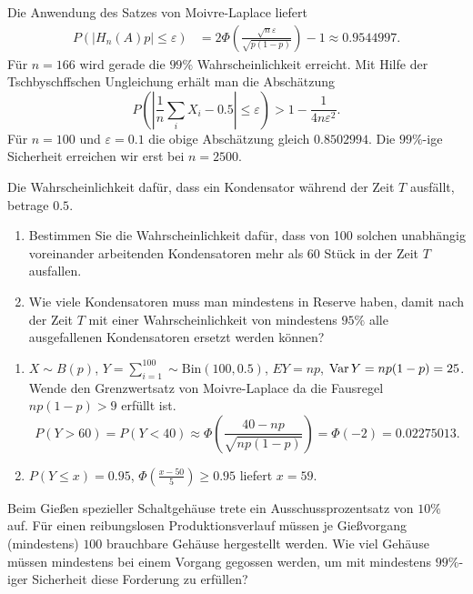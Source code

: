 \solution Die Anwendung des Satzes von Moivre-Laplace liefert
\begin{align*}
    P\left( | H_n(A) p | \leq \varepsilon \right) &= 
    2 \Phi\left ( \frac{\sqrt{n} \varepsilon}{ \sqrt{ p(1-p) }  } \right) -1 \approx 0.9544997.
\end{align*}
Für $n=166$ wird gerade die $99\%$ Wahrscheinlichkeit erreicht. Mit Hilfe der Tschbyschffschen
Ungleichung erhält man die Abschätzung
\begin{equation}
    P \left( | \frac{1}{n} \sum_{i}^{} X_i - 0.5 | \leq \varepsilon \right) > 1 - \frac{1}{4 n \varepsilon^2}.
\end{equation}
Für $n=100$ und $\varepsilon=0.1$ die obige Abschätzung gleich $0.8502994$. Die $99\%$-ige
Sicherheit erreichen wir erst bei $n=2500$. 

 Die Wahrscheinlichkeit dafür,
dass ein Kondensator während der Zeit $T$ ausfällt, betrage $0.5$. 
\begin{enumerate}
    \item Bestimmen Sie die Wahrscheinlichkeit dafür, dass von 100 solchen
        unabhängig voreinander arbeitenden Kondensatoren mehr als $60$ Stück in
        der Zeit $T$ ausfallen. 
    \item Wie viele Kondensatoren muss man mindestens in Reserve haben, damit
        nach der Zeit $T$ mit einer Wahrscheinlichkeit von mindestens $95\%$
        alle ausgefallenen Kondensatoren ersetzt werden können?
\end{enumerate}

\solution 
\begin{enumerate}
    \item $X\sim B(p)$, $Y=\sum_{i=1}^{100} \sim \text{Bin}(100,0.5)$, $E Y =
        np$, $\operatorname{Var} Y = np(1-p)= 25$. Wende den Grenzwertsatz von Moivre-Laplace
        da die Fausregel $np(1-p)>9$ erfüllt ist.
        \begin{equation*}
            P(Y>60) = P(Y < 40) \approx 
            \Phi\left( \frac{40 - np}{ \sqrt{np(1-p)}} \right) =
            \Phi(-2) = 0.02275013.
        \end{equation*}

    \item $P(Y \leq x) = 0.95$, $\Phi\left( \frac{x-50}{5} \right) \geq 0.95$
        liefert $x=59$. 
\end{enumerate}

 Beim Gießen spezieller
Schaltgehäuse trete ein Ausschussprozentsatz von $10\%$ auf. Für einen
reibungslosen Produktionsverlauf müssen je Gießvorgang (mindestens) $100$
brauchbare Gehäuse hergestellt werden.  Wie viel Gehäuse müssen mindestens bei
einem Vorgang gegossen werden, um mit mindestens $99\%$-iger Sicherheit diese
Forderung zu erfüllen?

